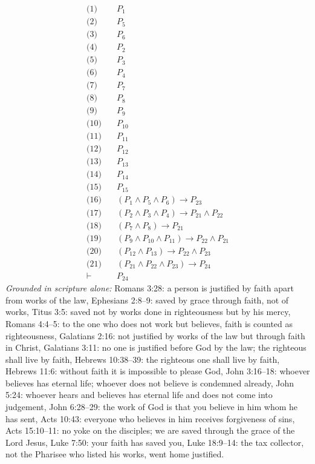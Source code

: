 \documentclass[11pt]{article}
\begin{document}
\begin{align*}
  \text{(1)} \quad & P_{1} \\
  \text{(2)} \quad & P_{5} \\
  \text{(3)} \quad & P_{6} \\
  \text{(4)} \quad & P_{2} \\
  \text{(5)} \quad & P_{3} \\
  \text{(6)} \quad & P_{4} \\
  \text{(7)} \quad & P_{7} \\
  \text{(8)} \quad & P_{8} \\
  \text{(9)} \quad & P_{9} \\
  \text{(10)} \quad & P_{10} \\
  \text{(11)} \quad & P_{11} \\
  \text{(12)} \quad & P_{12} \\
  \text{(13)} \quad & P_{13} \\
  \text{(14)} \quad & P_{14} \\
  \text{(15)} \quad & P_{15} \\
  \text{(16)} \quad & (P_{1} \land P_{5} \land P_{6}) \rightarrow P_{23} \\
  \text{(17)} \quad & (P_{2} \land P_{3} \land P_{4}) \rightarrow P_{21} \land P_{22} \\
  \text{(18)} \quad & (P_{7} \land P_{8}) \rightarrow P_{21} \\
  \text{(19)} \quad & (P_{9} \land P_{10} \land P_{11}) \rightarrow P_{22} \land P_{21} \\
  \text{(20)} \quad & (P_{12} \land P_{13}) \rightarrow P_{22} \land P_{23} \\
  \text{(21)} \quad & (P_{21} \land P_{22} \land P_{23}) \rightarrow P_{24} \\
  \vdash \quad & P_{24}
\end{align*}
\emph{Grounded in scripture alone:} Romans 3:28: a person is justified by faith apart from works of the law, Ephesians 2:8–9: saved by grace through faith, not of works, Titus 3:5: saved not by works done in righteousness but by his mercy, Romans 4:4–5: to the one who does not work but believes, faith is counted as righteousness, Galatians 2:16: not justified by works of the law but through faith in Christ, Galatians 3:11: no one is justified before God by the law; the righteous shall live by faith, Hebrews 10:38–39: the righteous one shall live by faith, Hebrews 11:6: without faith it is impossible to please God, John 3:16–18: whoever believes has eternal life; whoever does not believe is condemned already, John 5:24: whoever hears and believes has eternal life and does not come into judgement, John 6:28–29: the work of God is that you believe in him whom he has sent, Acts 10:43: everyone who believes in him receives forgiveness of sins, Acts 15:10–11: no yoke on the disciples; we are saved through the grace of the Lord Jesus, Luke 7:50: your faith has saved you, Luke 18:9–14: the tax collector, not the Pharisee who listed his works, went home justified.
\end{document}
